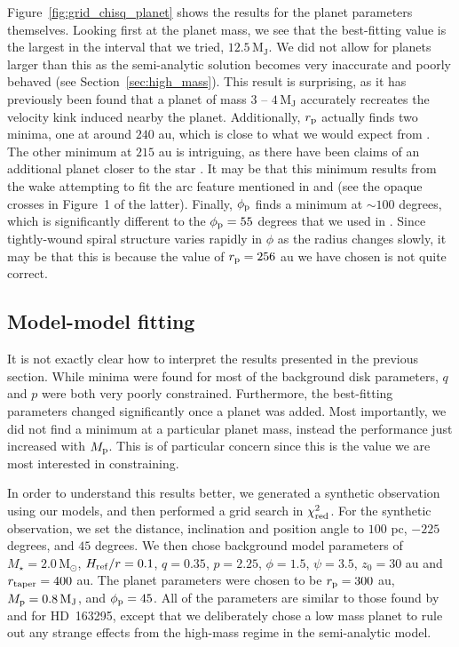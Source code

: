 Figure~\ref{fig:grid_chisq_planet} shows the results for the planet parameters themselves.
Looking first at the planet mass, we see that the best-fitting value is the largest in the interval that we tried, $12.5 \, \mathrm{M_J}$.
We did not allow for planets larger than this as the semi-analytic solution becomes very inaccurate and poorly behaved (see Section~\ref{sec:high_mass}).
This result is surprising, as it has previously been found that a planet of mass $3$ -- $4 \, \mathrm{M_J}$ accurately recreates the velocity kink induced nearby the planet.
Additionally, $r_{\rm p}$ actually finds two minima, one at around $240$ au, which is close to what we would expect from \citet{calcino2022}.
The other minimum at $215$ au is intriguing, as there have been claims of an additional planet closer to the star \citep{teague2018,pinte2020}.
It may be that this minimum results from the wake attempting to fit the arc feature mentioned in \citet{teague2021} and \citet{calcino2022} (see the opaque crosses in Figure~1 of the latter).
Finally, $\phi_{\rm p}$ finds a minimum at $\sim100$ degrees, which is significantly different to the $\phi_{\rm p}=55$ degrees that we used in \citet{calcino2022}.
Since tightly-wound spiral structure varies rapidly in $\phi$ as the radius changes slowly, it may be that this is because the value of $r_{\rm p}=256$ au we have chosen is not quite correct.

\subsection{Model-model fitting} \label{sec:model_model_fit}

It is not exactly clear how to interpret the results presented in the previous section.
While minima were found for most of the background disk parameters, $q$ and $p$ were both very poorly constrained.
Furthermore, the best-fitting parameters changed significantly once a planet was added.
Most importantly, we did not find a minimum at a particular planet mass, instead the performance just increased with $M_{\rm p}$.
This is of particular concern since this is the value we are most interested in constraining.

In order to understand this results better, we generated a synthetic observation using our models, and then performed a grid search in $\chi^2_{\rm red}$.
For the synthetic observation, we set the distance, inclination and position angle to $100$ pc, $-225$ degrees, and $45$ degrees.
We then chose background model parameters of $M_\star = 2.0 \, \mathrm{M_\odot}$, $H_{\rm ref}/r = 0.1$, $q=0.35$, $p=2.25$, $\phi=1.5$, $\psi=3.5$, $z_0 = 30$ au and $r_{\rm taper} = 400$ au.
The planet parameters were chosen to be $r_{\rm p} = 300$ au, $M_{\rm p}= 0.8 \, \mathrm{M_J}$, and $\phi_{\rm p}=45$.
All of the parameters are similar to those found by \citet{pinte2018a} and \citet{calcino2022} for HD~163295, except that we deliberately chose a low mass planet to rule out any strange effects from the high-mass regime in the semi-analytic model.

